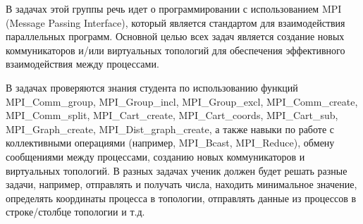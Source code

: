В задачах этой группы\cite{ref15} речь идет о программировании с использованием 
MPI (Message Passing Interface), который является стандартом для
 взаимодействия параллельных программ. Основной целью всех задач 
 является создание новых коммуникаторов и/или виртуальных топологий для
  обеспечения эффективного взаимодействия между процессами.

В задачах проверяются знания студента по использованию функций 
MPI\_Comm\_group, MPI\_Group\_incl, MPI\_Group\_excl, MPI\_Comm\_create,
 MPI\_Comm\_split, MPI\_Cart\_create, MPI\_Cart\_coords, MPI\_Cart\_sub, 
 MPI\_Graph\_create, MPI\_Dist\_graph\_create, а также навыки по работе
  с коллективными операциями (например, MPI\_Bcast, MPI\_Reduce), обмену
   сообщениями между процессами, созданию новых коммуникаторов и 
   виртуальных топологий. В разных задачах ученик должен будет решать
    разные задачи, например, отправлять и получать числа, находить 
	минимальное значение, определять координаты процесса в топологии, 
	отправлять данные из процессов в строке/столбце топологии и т.д.


\newpage
